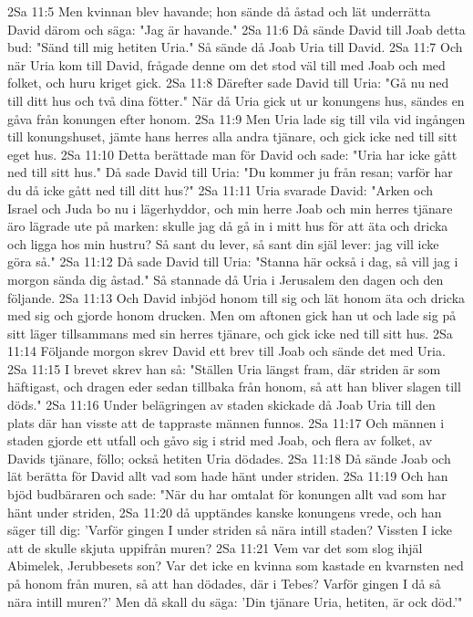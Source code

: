 2Sa 11:5  Men kvinnan blev havande; hon sände då åstad och lät underrätta David därom och säga: "Jag är havande."
2Sa 11:6  Då sände David till Joab detta bud: "Sänd till mig hetiten Uria." Så sände då Joab Uria till David.
2Sa 11:7  Och när Uria kom till David, frågade denne om det stod väl till med Joab och med folket, och huru kriget gick.
2Sa 11:8  Därefter sade David till Uria: "Gå nu ned till ditt hus och två dina fötter." När då Uria gick ut ur konungens hus, sändes en gåva från konungen efter honom.
2Sa 11:9  Men Uria lade sig till vila vid ingången till konungshuset, jämte hans herres alla andra tjänare, och gick icke ned till sitt eget hus.
2Sa 11:10  Detta berättade man för David och sade: "Uria har icke gått ned till sitt hus." Då sade David till Uria: "Du kommer ju från resan; varför har du då icke gått ned till ditt hus?"
2Sa 11:11  Uria svarade David: "Arken och Israel och Juda bo nu i lägerhyddor, och min herre Joab och min herres tjänare äro lägrade ute på marken: skulle jag då gå in i mitt hus för att äta och dricka och ligga hos min hustru? Så sant du lever, så sant din själ lever: jag vill icke göra så."
2Sa 11:12  Då sade David till Uria: "Stanna här också i dag, så vill jag i morgon sända dig åstad." Så stannade då Uria i Jerusalem den dagen och den följande.
2Sa 11:13  Och David inbjöd honom till sig och lät honom äta och dricka med sig och gjorde honom drucken. Men om aftonen gick han ut och lade sig på sitt läger tillsammans med sin herres tjänare, och gick icke ned till sitt hus.
2Sa 11:14  Följande morgon skrev David ett brev till Joab och sände det med Uria.
2Sa 11:15  I brevet skrev han så: "Ställen Uria längst fram, där striden är som häftigast, och dragen eder sedan tillbaka från honom, så att han bliver slagen till döds."
2Sa 11:16  Under belägringen av staden skickade då Joab Uria till den plats där han visste att de tappraste männen funnos.
2Sa 11:17  Och männen i staden gjorde ett utfall och gåvo sig i strid med Joab, och flera av folket, av Davids tjänare, föllo; också hetiten Uria dödades.
2Sa 11:18  Då sände Joab och lät berätta för David allt vad som hade hänt under striden.
2Sa 11:19  Och han bjöd budbäraren och sade: "När du har omtalat för konungen allt vad som har hänt under striden,
2Sa 11:20  då upptändes kanske konungens vrede, och han säger till dig: 'Varför gingen I under striden så nära intill staden? Vissten I icke att de skulle skjuta uppifrån muren?
2Sa 11:21  Vem var det som slog ihjäl Abimelek, Jerubbesets son? Var det icke en kvinna som kastade en kvarnsten ned på honom från muren, så att han dödades, där i Tebes? Varför gingen I då så nära intill muren?' Men då skall du säga: 'Din tjänare Uria, hetiten, är ock död.'"
